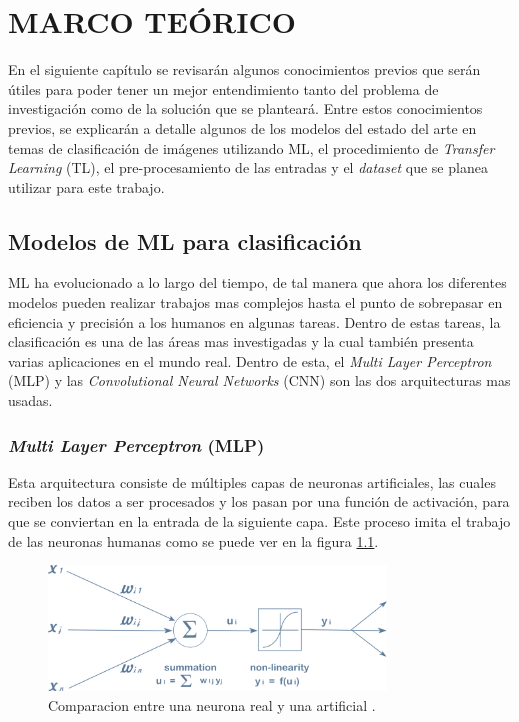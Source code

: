 \chapter{MARCO TEÓRICO}

En el siguiente capítulo se revisarán algunos conocimientos previos 
que serán útiles para poder tener un mejor entendimiento tanto del 
problema de investigación como de la solución que se planteará. 
Entre estos conocimientos previos, se explicarán a detalle algunos 
de los modelos del estado del arte en temas de clasificación de 
imágenes utilizando ML, el procedimiento de \textit{Transfer Learning} (TL), 
el pre-procesamiento de las entradas y el \textit{dataset} que se 
planea utilizar para este trabajo.\\

\section{Modelos de ML para clasificación}

ML ha evolucionado a lo largo del tiempo, de tal manera que ahora los 
diferentes modelos pueden realizar trabajos mas complejos hasta el 
punto de sobrepasar en eficiencia y precisión a los humanos en algunas 
tareas. Dentro de estas tareas, la clasificación es una de las 
áreas mas investigadas y la cual también presenta varias aplicaciones 
en el mundo real. Dentro de esta, el 
\textit{Multi Layer Perceptron} (MLP) y las 
\textit{Convolutional Neural Networks} (CNN) son las dos arquitecturas 
mas usadas.

\subsection{\textit{Multi Layer Perceptron} (MLP)}

Esta arquitectura consiste de múltiples 
capas de neuronas artificiales, las cuales reciben los datos a ser 
procesados y los pasan por una función de activación, para 
que se conviertan en la entrada de la siguiente capa. Este proceso imita 
el trabajo de las neuronas humanas como se puede ver en la figura 
\ref{neurona}. \\

\begin{figure}[h!]
\includegraphics[width=0.8\textwidth]{images/comparacion_neuronas.jpg}
\centering
\caption{Comparacion entre una neurona real y una artificial \cite{neuronas}.}
\label{neurona}
\end{figure}

